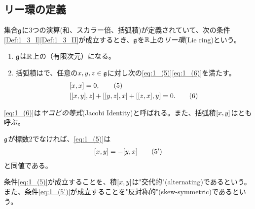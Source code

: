\documentclass[fleqn,twocolumn,titlepage,dvipdfmx]{jsarticle}
\begin{document}
\subsection{リー環の定義}

\begin{definition}[リー環]
  \label{Def:1_3}
  集合$\mathfrak{g}$に3つの演算(和、スカラー倍、括弧積)が定義されていて、次の条件\ref{Def:1_3_I}\ref{Def:1_3_II}が成立するとき、$\mathfrak{g}$を$\mathbb{R}$上の\emph{リー環}(Lie ring)という。
  \begin{enumerate}[label=(\Roman*$^\prime$)]
    \item \label{Def:1_3_I}
      $\mathfrak{g}$は$\mathbb{R}$上の（有限次元）になる。
    \item \label{Def:1_3_II}
      括弧積はで、任意の$x,y,z\in \mathfrak{g}$に対し次の\eqref{eq:1_(5)}\eqref{eq:1_(6)}を満たす。
    \begin{align}
      & \comm{x}{x} = 0, \tag{5}\label{eq:1_(5)}\\
      & \comm{\comm{x}{y}}{z}+\comm{\comm{y}{z}}{x}+\comm{\comm{z}{x}}{y}=0.\tag{6}\label{eq:1_(6)}
    \end{align}
  \end{enumerate}
\end{definition}
\begin{named}
  \eqref{eq:1_(6)}は\emph{ヤコビの等式}(Jacobi Identity)と呼ばれる。また、括弧積$\comm{x}{y}$はとも呼ぶ。
\end{named}
\begin{remark}
  $\mathfrak{g}$が標数$2$でなければ、\eqref{eq:1_(5)}は
  \begin{align}
    \comm{x}{y}=-\comm{y}{x} \tag{5$^\prime$}\label{eq:1_(5')}
  \end{align}
  と同値である。
\end{remark}

\begin{named}
  条件\eqref{eq:1_(5)}が成立することを、積$\comm{x}{y}$は"交代的"(alternating)であるという。
  また、条件\eqref{eq:1_(5')}が成立することを"反対称的"(skew-symmetric)であるという。
\end{named}
\end{document}
